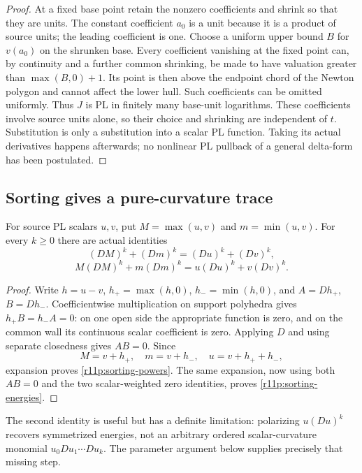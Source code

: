\begin{proof}
At a fixed base point retain the nonzero coefficients and shrink so
that they are units.  The constant coefficient $a_0$ is a unit because
it is a product of source units; the leading coefficient is one.
Choose a uniform upper bound $B$ for $v(a_0)$ on the shrunken base.
Every coefficient vanishing at the fixed point can, by continuity and
a further common shrinking, be made to have valuation greater than
$\max(B,0)+1$.  Its point is then above the endpoint chord of the
Newton polygon and cannot affect the lower hull.  Such coefficients
can be omitted uniformly.
Thus $J$ is PL in finitely many base-unit logarithms.  These
coefficients involve source units alone, so their choice and shrinking
are independent of $t$.  Substitution is only a substitution into a
scalar PL function.  Taking its actual derivatives happens afterwards;
no nonlinear PL pullback of a general delta-form has been postulated.
\end{proof}

\subsection{Sorting gives a pure-curvature trace}

\begin{lemma}
\label{r11p:sorting}
For source PL scalars $u,v$, put $M=\max(u,v)$ and $m=\min(u,v)$.
For every $k\geq0$ there are actual identities
\[
 (DM)^k+(Dm)^k=(Du)^k+(Dv)^k,
\tag{MT3}\label{r11p:sorting-powers}
\]
\[
 M(DM)^k+m(Dm)^k=u(Du)^k+v(Dv)^k.
\tag{MT4}\label{r11p:sorting-energies}
\]
\end{lemma}

\begin{proof}
Write $h=u-v$, $h_+=\max(h,0)$, $h_-=\min(h,0)$, and
$A=Dh_+$, $B=Dh_-$.  Coefficientwise multiplication on support
polyhedra gives $h_+B=h_-A=0$: on one open side the appropriate
function is zero, and on the common wall its continuous scalar
coefficient is zero.  Applying $D$ and using separate closedness gives
$AB=0$.  Since
\[
 M=v+h_+,\quad m=v+h_-,\quad u=v+h_++h_-,
\]
expansion proves \eqref{r11p:sorting-powers}.  The same expansion,
now using both $AB=0$ and the two scalar-weighted zero identities,
proves \eqref{r11p:sorting-energies}.
\end{proof}

The second identity is useful but has a definite limitation:
polarizing $u(Du)^k$ recovers symmetrized energies, not an arbitrary
ordered scalar-curvature monomial $u_0Du_1\cdots Du_k$.
The parameter argument below supplies precisely that missing step.

